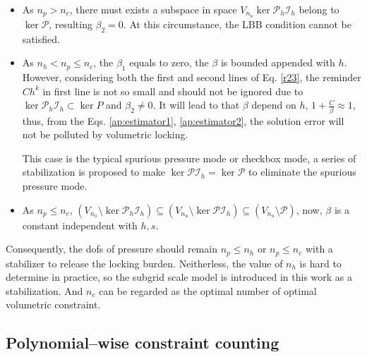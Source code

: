 \begin{pf}
\begin{itemize}
    \item As $n_p > n_c$, there must exists a subspace in space $V_{n_u}\ker \mathcal P_h \mathcal I_h$ belong to $\ker \mathcal P$, resulting $\beta_2 = 0$. At this circumstance, the LBB condition cannot be satisfied.
    \item As $n_h < n_p \le n_c$, the $\beta_1$ equals to zero, the $\beta$ is bounded appended with $h$. However, considering both the first and second lines of Eq. \eqref{r23}, the reminder $Ch^k$ in first line is not so small and should not be ignored due to $\ker \mathcal P_h \mathcal I_h \subset \ker P$ and $\beta_2 \ne 0$. 
        It will lead to that $\beta$ depend on $h$, $1+\frac{C}{\beta} \approx 1$, thus, from the Eqs. \eqref{ap:estimator1}, \eqref{ap:estimator2}, the solution error will not be polluted by volumetric locking. \cite{bathe2001}

    This case is the typical spurious pressure mode or checkbox mode, a series of stabilization \cite{vadala-roth2020} is proposed to make $\ker \mathcal P \mathcal I_h = \ker \mathcal P$ to eliminate the spurious pressure mode.
\item As $n_p \le n_c$, $(V_{n_u}\setminus \ker \mathcal P_h \mathcal I_h) \subseteq (V_{n_u}\setminus \ker \mathcal P \mathcal I_h) \subseteq (V_{n_u}\setminus \mathcal P)$, now, $\beta$ is a constant independent with $h,s$.
\end{itemize}

    Consequently, the dofs of pressure should remain $n_p\le n_h$ or $n_p\le n_c$ with a stabilizer to release the locking burden. Neitherless, the value of $n_h$ is hard to determine in practice, so the subgrid scale model \cite{hughes1986} is introduced in this work as a stabilization. And $n_c$ can be regarded as the optimal number of optimal volumetric constraint.
\end{pf}

\subsection{Polynomial--wise constraint counting}

